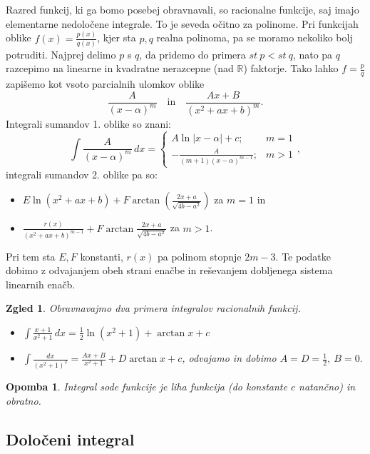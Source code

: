 \documentclass[10pt, a4paper]{article}
\newtheorem*{opomba}{Opomba}
\newtheorem{zgled}{Zgled}[section]
\newcommand{\R}{\mathbb {R}}
\begin{document}
Razred funkcij, ki ga bomo posebej obravnavali, so racionalne funkcije, saj imajo elementarne nedoločene integrale.
To je seveda očitno za polinome. Pri funkcijah oblike $f(x) = \frac{p(x)}{q(x)}$, kjer sta $p,q$ realna polinoma, pa se moramo nekoliko bolj potruditi.
Najprej delimo $p$ s $q$, da pridemo do primera $st\ p < st\ q$, nato pa $q$ razcepimo na linearne in kvadratne nerazcepne (nad $\R$) faktorje.
Tako lahko $f = \frac{p}{q}$ zapišemo kot vsoto parcialnih ulomkov oblike
$$\frac{A}{(x - \alpha)^m} \quad \text{in} \quad \frac{Ax + B}{(x^2 + ax + b)^m}.$$
Integrali sumandov 1. oblike so znani:
$$\int \frac{A}{(x - \alpha)^m}\,dx = \begin{cases}
    A \ln |x - \alpha| + c ;& m = 1\\
    - \frac{A}{(m + 1)(x - \alpha)^{m - 1}} ;& m > 1
\end{cases},$$
integrali sumandov 2. oblike pa so:
\begin{itemize}
    \item $E \ln (x^2 + ax + b) + F \arctan \left(\frac{2x + a}{\sqrt{4b - a^2}} \right)$ za $m = 1$ in 
    \item $\frac{r(x)}{(x^2 + ax + b)^{m-1}} + F \arctan \frac{2x + a}{\sqrt{4b - a^2}}$ za $m > 1$.
\end{itemize}
Pri tem sta $E,F$ konstanti, $r(x)$ pa polinom stopnje $2m -3$. Te podatke dobimo z odvajanjem obeh strani enačbe in reševanjem dobljenega sistema linearnih enačb.

\begin{zgled}
    Obravnavajmo dva primera integralov racionalnih funkcij.
    \begin{itemize}
        \item $\int \frac{x + 1}{x^2 + 1}\,dx = \frac{1}{2} \ln (x^2 + 1) + \arctan x + c$
        \item $\int \frac{dx}{(x^2 + 1)^2} = \frac{Ax + B}{x^2 + 1} + D \arctan x + c$, odvajamo in dobimo $A=D= \frac{1}{2},\ B = 0.$
    \end{itemize}
\end{zgled}

\begin{opomba}
    Integral sode funkcije je liha funkcija (do konstante $c$ natančno) in obratno.
\end{opomba}

\subsection{Določeni integral}
\end{document}
